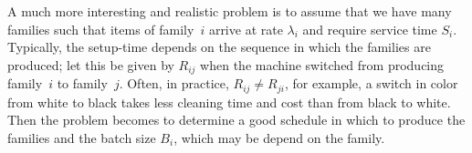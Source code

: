 \begin{remark}
A much more interesting and realistic problem is to assume that we have many families such that items of family~$i$ arrive at rate $\lambda_i$ and require service time $S_i$.
Typically, the setup-time depends on the sequence in which the families are produced; let this be given by $R_{ij}$ when the machine switched from producing family~$i$ to family~$j$.
Often, in practice, $R_{ij} \neq R_{ji}$, for example, a switch in color from white to black takes less cleaning time and cost than from black to white.
Then the problem becomes to determine a good schedule in which to produce the families and the batch size $B_i$, which may be depend on the family. 
\end{remark}



